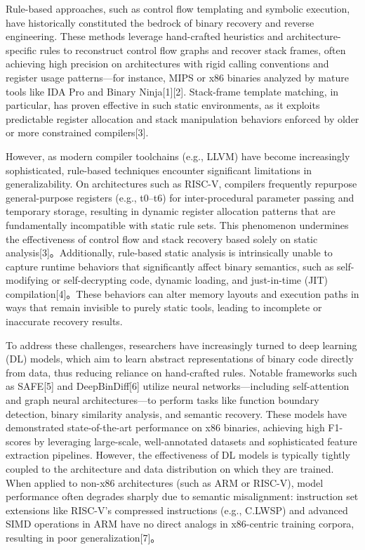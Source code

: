 \documentclass[acmsmall,screen,review,anonymous]{acmart} %
\begin{document}
Rule-based approaches, such as control flow templating and symbolic execution, have historically constituted the bedrock of binary recovery and reverse engineering. These methods leverage hand-crafted heuristics and architecture-specific rules to reconstruct control flow graphs and recover stack frames, often achieving high precision on architectures with rigid calling conventions and register usage patterns—for instance, MIPS or x86 binaries analyzed by mature tools like IDA Pro and Binary Ninja[1][2]. Stack-frame template matching, in particular, has proven effective in such static environments, as it exploits predictable register allocation and stack manipulation behaviors enforced by older or more constrained compilers[3].

However, as modern compiler toolchains (e.g., LLVM) have become increasingly sophisticated, rule-based techniques encounter significant limitations in generalizability. On architectures such as RISC-V, compilers frequently repurpose general-purpose registers (e.g., t0–t6) for inter-procedural parameter passing and temporary storage, resulting in dynamic register allocation patterns that are fundamentally incompatible with static rule sets. This phenomenon undermines the effectiveness of control flow and stack recovery based solely on static analysis[3]。Additionally, rule-based static analysis is intrinsically unable to capture runtime behaviors that significantly affect binary semantics, such as self-modifying or self-decrypting code, dynamic loading, and just-in-time (JIT) compilation[4]。These behaviors can alter memory layouts and execution paths in ways that remain invisible to purely static tools, leading to incomplete or inaccurate recovery results.

To address these challenges, researchers have increasingly turned to deep learning (DL) models, which aim to learn abstract representations of binary code directly from data, thus reducing reliance on hand-crafted rules. Notable frameworks such as SAFE[5] and DeepBinDiff[6] utilize neural networks—including self-attention and graph neural architectures—to perform tasks like function boundary detection, binary similarity analysis, and semantic recovery. These models have demonstrated state-of-the-art performance on x86 binaries, achieving high F1-scores by leveraging large-scale, well-annotated datasets and sophisticated feature extraction pipelines. However, the effectiveness of DL models is typically tightly coupled to the architecture and data distribution on which they are trained. When applied to non-x86 architectures (such as ARM or RISC-V), model performance often degrades sharply due to semantic misalignment: instruction set extensions like RISC-V’s compressed instructions (e.g., C.LWSP) and advanced SIMD operations in ARM have no direct analogs in x86-centric training corpora, resulting in poor generalization[7]。
\end{document}
